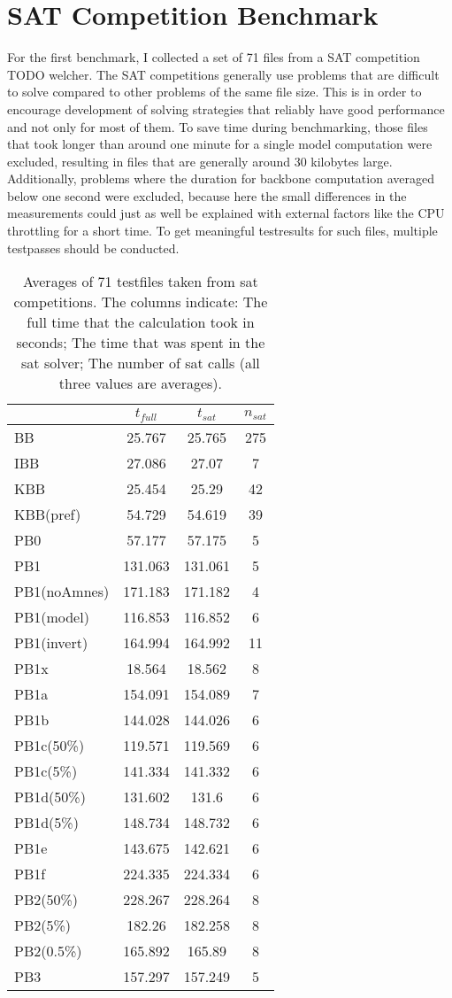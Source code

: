 \section{SAT Competition Benchmark}

For the first benchmark, I collected a set of 71 files from a SAT competition TODO welcher. The SAT competitions generally use problems that are difficult to solve compared to other problems of the same file size. This is in order to encourage development of solving strategies that reliably have good performance and not only for most of them. To save time during benchmarking, those files that took longer than around one minute for a single model computation were excluded, resulting in files that are generally around 30 kilobytes large. Additionally, problems where the duration for backbone computation averaged below one second were excluded, because here the small differences in the measurements could just as well be explained with external factors like the CPU throttling for a short time. To get meaningful testresults for such files, multiple testpasses should be conducted.

\begin{table} %
\begin{tabular}{l| c c c }
 & $t_{full}$ & $t_{sat}$ & $n_{sat}$ \\
 \hline
BB & 25.767 & 25.765 & 275 \\
IBB & 27.086 & 27.07 & 7 \\
KBB & 25.454 & 25.29 & 42 \\
KBB(pref) & 54.729 & 54.619 & 39 \\
PB0 & 57.177 & 57.175 & 5 \\
PB1 & 131.063 & 131.061 & 5 \\
PB1(noAmnes) & 171.183 & 171.182 & 4 \\
PB1(model) & 116.853 & 116.852 & 6 \\
PB1(invert) & 164.994 & 164.992 & 11 \\
PB1x & 18.564 & 18.562 & 8 \\
PB1a & 154.091 & 154.089 & 7 \\
PB1b & 144.028 & 144.026 & 6 \\
PB1c(50\%) & 119.571 & 119.569 & 6 \\
PB1c(5\%) & 141.334 & 141.332 & 6 \\
PB1d(50\%) & 131.602 & 131.6 & 6 \\
PB1d(5\%) & 148.734 & 148.732 & 6 \\
PB1e & 143.675 & 142.621 & 6 \\
PB1f & 224.335 & 224.334 & 6 \\
PB2(50\%) & 228.267 & 228.264 & 8 \\
PB2(5\%) & 182.26 & 182.258 & 8 \\
PB2(0.5\%) & 165.892 & 165.89 & 8 \\
PB3 & 157.297 & 157.249 & 5
\end{tabular}
\caption{Averages of 71 testfiles taken from sat competitions. The columns indicate: The full time that the calculation took in seconds; The time that was spent in the sat solver; The number of sat calls (all three values are averages). }
\label{tab:satCompAvg} %
\end{table}

